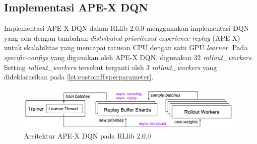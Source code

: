 \subsection{Implementasi APE-X DQN}
Implementasi APE-X DQN dalam RLlib 2.0.0 menggunakan implementasi DQN yang ada dengan
tambahan \emph{distributed prioritezed experience replay} (APE-X) untuk skalabilitas
yang mencapai ratusan CPU dengan satu GPU \emph{learner}. Pada \emph{specific-configs}
yang digunakan oleh APE-X DQN, digunakan 32 \emph{rollout\_workers}. Setting \emph{rollout\_workers}
tersebut terganti oleh 3 \emph{rollout\_workers} yang dideklarasikan pada \ref{lst:customHyperparameter}.

\begin{figure}[H]
  \centering
    \includegraphics[scale=0.6]{gambar/rllib_apex-dqn_architecture.png}
    \caption{Arsitektur APE-X DQN pada RLlib 2.0.0 \citep{rllibDocumentation}}
    \label{fig:rllib_apex-dqn_architecture}
\end{figure}

